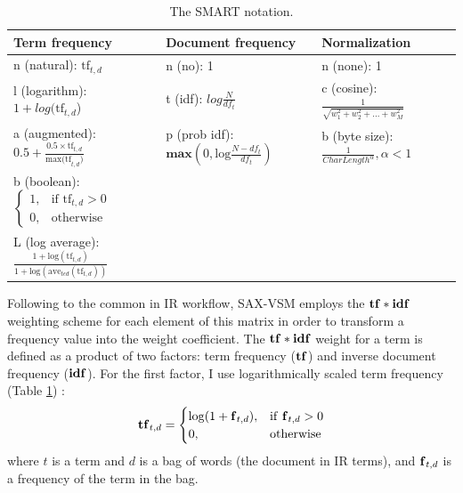 \begin{table}
\caption{The SMART notation. }
\vspace{0.4cm}
\label{tbl:smart}
\begin{tabularx}{\textwidth}{l l l}
\toprule[1pt]
\textbf{Term frequency} &\textbf{Document frequency} &\textbf{Normalization} \\[0.5ex]
\midrule
n (natural):  $\text{tf}_{t,d}$ & n (no): 1 & n (none): 1 \\[2ex]
l (logarithm): $1+log(\text{tf}_{t,d}$) & t (idf): $log\tfrac{N}{df_{t}}$ & c (cosine): $\tfrac{1}{\sqrt{w_1^2 + w_2^2 + ... + w_M^2}}$ \\[2ex]
a (augmented): $0.5 + \tfrac{0.5 \times \text{tf}_{t,d}}{\text{max(tf}_{t,d})}$ & p (prob idf): $\textbf{max}\left( 0,\text{log}\tfrac{N-df_{t}}{df_{t}} \right) $ & 
b (byte size): $\tfrac{1}{CharLength^\alpha}, \alpha < 1 $ \\[2ex]
b (boolean): $\begin{cases} 1, & \text{if tf}_{t,d} > 0 \\ 0, & \text{otherwise} \end{cases} $ & & \\[3ex]
L (log average): $ \tfrac{1+\text{log}(\text{tf}_{t,d})}{1+\text{log}(\text{ave}_{t \epsilon d}( \text{tf}_{t,d}))}$ & & \\[1ex]
\bottomrule[1pt]
\end{tabularx}
\end{table}

Following to the common in IR workflow, SAX-VSM employs the $\text{\textbf{tf}}\ast\text{\textbf{idf}}$ weighting scheme 
\cite{citeulike:4469058} for each element of this matrix in order to transform a frequency value into the 
weight coefficient. 
The $\text{\textbf{tf}}\ast\text{\textbf{idf}}$ weight for a term is defined as a product of two factors: term frequency ($\text{\textbf{tf}}$) 
and inverse document frequency ($\text{\textbf{idf}}$). 
For the first factor, I use logarithmically scaled term frequency (Table \ref{tbl:smart}) \cite{citeulike:4469058}:
\begin{equation}
 \mbox{\textbf{tf}}_{t, d} =  \begin{cases} \log(1 + \mbox{\textbf{f}}_{t,d}), &\mbox{if \textbf{f}}_{t,d}>0  \\
0, & \mbox{otherwise} \end{cases}
\end{equation} 
where $t$ is a term and $d$ is a bag of words (the document in IR terms), and $\mbox{\textbf{f}}_{t,d}$ 
is a frequency of the term in the bag.

